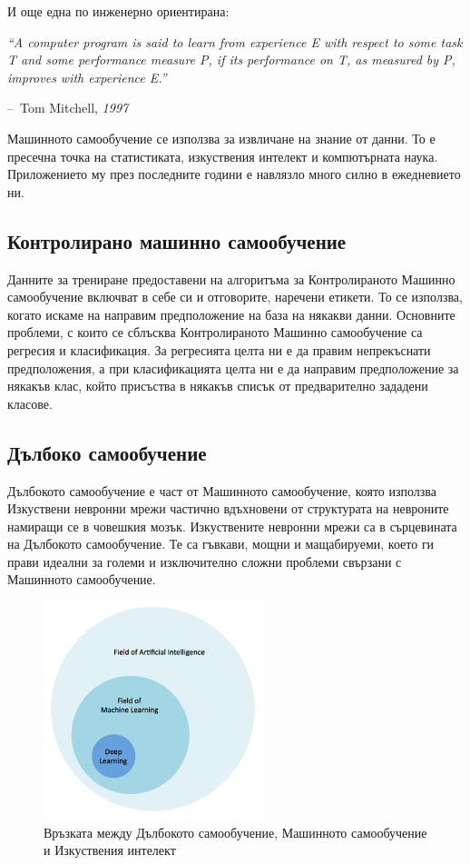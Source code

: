 \documentclass{article}
\makeatletter
\newenvironment{chapquote}[2][2em]
{\setlength{\@tempdima}{#1}%
\def\chapquote@author{#2}%
\parshape 1 \@tempdima \dimexpr\textwidth-2\@tempdima\relax%
\itshape}
{\par\normalfont\hfill--\ \chapquote@author\hspace*{\@tempdima}\par\bigskip}
\makeatother
\begin{document}
И още една по инженерно ориентирана:

\begin{chapquote}{Tom Mitchell, \textit{1997} \cite{hands-on-ml}}
  ``A computer program is said to learn from experience E with respect to some task T and some performance measure P,
  if its performance on T, as measured by P, improves with experience E.''
\end{chapquote}

Машинното самообучение се използва за извличане на знание от данни. То е пресечна точка на статистиката, изкуствения
интелект и компютърната наука. Приложението му през последните години е навлязло много силно в ежедневието ни.
\cite{intro-to-ml}

\subsection{Контролирано машинно самообучение}

Данните за трениране предоставени на алгоритъма за Контролираното Машинно самообучение включват в себе си и отговорите,
наречени етикети. \cite{hands-on-ml} То се използва, когато искаме на направим предположение на база на някакви данни.
Основните проблеми, с които се сблъсква Контролираното Машинно самообучение са регресия и класификация. За регресията
целта ни е да правим непрекъснати предположения, а при класификацията целта ни е да направим предположение за някакъв
клас, който присъства в някакъв списък от предварително зададени класове. \cite{intro-to-ml}

\subsection{Дълбоко самообучение}

Дълбокото самообучение е част от Машинното самообучение, която използва Изкуствени невронни мрежи частично вдъхновени
от структурата на невроните намиращи се в човешкия мозък. \cite{deep-learning-keras} Изкуствените невронни мрежи са в
сърцевината на Дълбокото самообучение. Те са гъвкави, мощни и мащабируеми, което ги прави идеални за големи и
изключително сложни проблеми свързани с Машинното самообучение. \cite{hands-on-ml}

\begin{figure}[H]
  \centering
  \captionsetup{justification=centering}
  \includegraphics{chapter-03/deep-learning.png}
  \caption{Връзката между Дълбокото самообучение, Машинното самообучение и Изкуствения интелект}
\end{figure}
\end{document}
